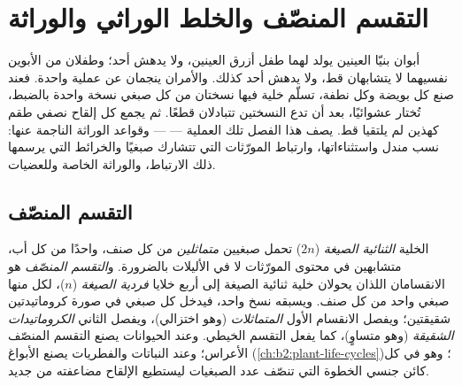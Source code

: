 \chapter{التقسم المنصّف والخلط الوراثي والوراثة}\label{ch:b2:meiosis-heredity}

أبوان بنيّا العينين يولد لهما طفل أزرق العينين، ولا يدهش أحد؛ وطفلان
من الأبوين نفسيهما لا يتشابهان قط، ولا يدهش أحد كذلك. والأمران
ينجمان عن عملية واحدة. فعند صنع كل بويضة وكل نطفة، تسلّم خلية فيها
نسختان من كل صبغي نسخة واحدة بالضبط، تُختار عشوائيًا، بعد أن تدع
النسختين تتبادلان قطعًا. ثم يجمع كل إلقاح نصفي طقم كهذين لم يلتقيا
قط. يصف هذا الفصل تلك العملية ---  --- وقواعد الوراثة
الناجمة عنها: نسب مندل واستثناءاتها، وارتباط المورّثات التي تتشارك
صبغيًا والخرائط التي يرسمها ذلك الارتباط، والوراثة الخاصة  وللعضيات.

\section{التقسم المنصّف}

\begin{definition}\label{def:b2:meiosis-heredity:meiosis}
الخلية \emph{الثنائية الصيغة} ($2n$) تحمل صبغيين
\emph{متماثلين} من كل صنف، واحدًا من كل أب، متشابهين في محتوى
المورّثات لا في الأليلات بالضرورة. و\emph{التقسم المنصّف} هو
الانقسامان اللذان يحولان خلية ثنائية الصيغة إلى أربع خلايا
\emph{فردية الصيغة} ($n$)، لكل منها صبغي واحد من كل صنف. ويسبقه نسخ
واحد، فيدخل كل صبغي في صورة كروماتيدتين شقيقتين؛ ويفصل الانقسام
الأول \emph{المتماثلات} (وهو اختزالي)، ويفصل الثاني
\emph{الكروماتيدات الشقيقة} (وهو متساوٍ)، كما يفعل التقسم الخيطي.
وعند الحيوانات يصنع التقسم المنصّف الأعراس؛ وعند النباتات والفطريات
يصنع الأبواغ (\cref{ch:b2:plant-life-cycles})؛ وهو في كل كائن جنسي
الخطوة التي تنصّف عدد الصبغيات ليستطيع الإلقاح مضاعفته من جديد.
\end{definition}

